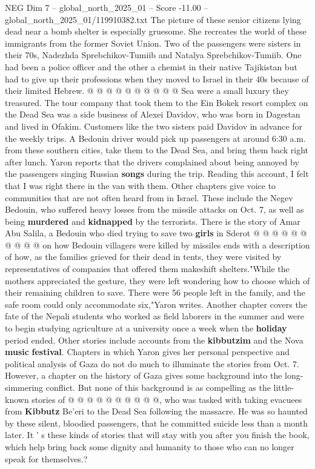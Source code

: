 \begin{textsample}{NEG Dim 7 – global\_north\_2025\_01 – Score -11.00 – global\_north\_2025\_01/119910382.txt}
The picture of these senior citizens lying dead near a bomb shelter is especially gruesome.
She recreates the world of these immigrants from the former Soviet Union.
Two of the passengers were sisters in their 70s, Nadezhda Sprebchikov-Tumiib and Natalya Sprebchikov-Tumiib.
One had been a police officer and the other a chemist in their native Tajikistan but had to give up their professions when they moved to Israel in their 40s because of their limited Hebrew. @ @ @ @ @ @ @ @ @ @ Sea were a small luxury they treasured.
The tour company that took them to the Ein Bokek resort complex on the Dead Sea was a side business of Alexei Davidov, who was born in Dagestan and lived in Ofakim.
Customers like the two sisters paid Davidov in advance for the weekly trips.
A Bedouin driver would pick up passengers at around 6:30 a.m. from these southern cities, take them to the Dead Sea, and bring them back right after lunch.
Yaron reports that the drivers complained about being annoyed by the passengers singing Russian \textbf{songs} during the trip.
Reading this account, I felt that I was right there in the van with them.
Other chapters give voice to communities that are not often heard from in Israel.
These include the Negev Bedouin, who suffered heavy losses from the missile attacks on Oct. 7, as well as being \textbf{murdered} and \textbf{kidnapped} by the terrorists.
There is the story of Amar Abu Salila, a Bedouin who died trying to save two \textbf{girls} in Sderot @ @ @ @ @ @ @ @ @ @ on how Bedouin villagers were killed by missiles ends with a description of how, as the families grieved for their dead in tents, they were visited by representatives of companies that offered them makeshift shelters."While the mothers appreciated the gesture, they were left wondering how to choose which of their remaining children to save.
There were 56 people left in the family, and the safe room could only accommodate six,"Yaron writes.
Another chapter covers the fate of the Nepali students who worked as field laborers in the summer and were to begin studying agriculture at a university once a week when the \textbf{holiday} period ended.
Other stories include accounts from the \textbf{kibbutzim} and the Nova \textbf{music} \textbf{festival}.
Chapters in which Yaron gives her personal perspective and political analysis of Gaza do not do much to illuminate the stories from Oct. 7.
However, a chapter on the history of Gaza gives some background into the long-simmering conflict.
But none of this background is as compelling as the little-known stories of @ @ @ @ @ @ @ @ @ @, who was tasked with taking evacuees from \textbf{Kibbutz} Be'eri to the Dead Sea following the massacre.
He was so haunted by these silent, bloodied passengers, that he committed suicide less than a month later.
It ' s these kinds of stories that will stay with you after you finish the book, which help bring back some dignity and humanity to those who can no longer speak for themselves.?

\end{textsample}
